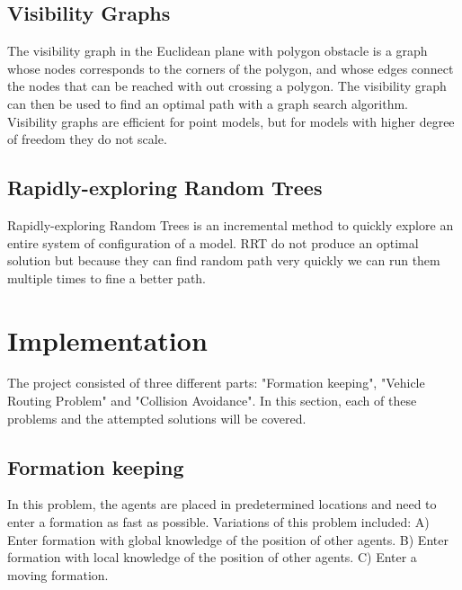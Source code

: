 \documentclass[a4paper,12pt]{article}
\begin{document}
\subsection{}
\label{sec:mm}

\subsection{Visibility Graphs} 
\label{sec:vg}
The visibility graph\cite{berg_visibility_2000} in the Euclidean plane with polygon obstacle is a graph whose nodes corresponds to the corners of the polygon, and whose edges connect the nodes that can be reached with out crossing a polygon. The visibility graph can then be used to find an optimal path with a graph search algorithm. Visibility graphs are efficient for point models, but for models with higher degree of freedom they do not scale. 

 
\subsection{Rapidly-exploring Random Trees} 
\label{sec:rrt}
Rapidly-exploring Random Trees \cite{lavalle1998rapidly} is an incremental method to quickly explore an entire system of configuration of a model. RRT do not produce an optimal solution but because they can find random path very quickly we can run them multiple times to fine a better path.  

\subsection{}
\label{sec:pp}

\section{Implementation}
\label{sec:method}
The project consisted of three different parts: "Formation keeping", "Vehicle Routing Problem" and "Collision Avoidance". In this section, each of these problems and the attempted solutions will be covered.  
\subsection{Formation keeping}
\label{sec:mmImpl}
In this problem, the agents are placed in predetermined locations and need to enter a formation as fast as possible. Variations of this problem included:
A) Enter formation with global knowledge of the position of other agents.
B) Enter formation with local knowledge of the position of other agents.
C) Enter a moving formation.
\end{document}
